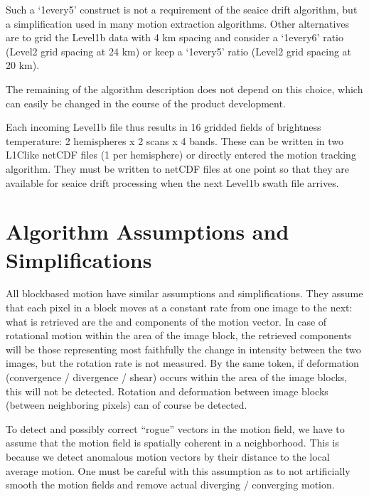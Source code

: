 \documentclass[letterpaper,10pt,english]{jupyterBook}
\begin{document}
\sphinxAtStartPar
Such a ‘1\sphinxhyphen{}every\sphinxhyphen{}5’ construct is not a requirement of the sea\sphinxhyphen{}ice drift algorithm, but a simplification used in many motion extraction algorithms. Other alternatives are to grid the Level\sphinxhyphen{}1b data with
4 km spacing and consider a ‘1\sphinxhyphen{}every\sphinxhyphen{}6’ ratio (Level\sphinxhyphen{}2 grid spacing at 24 km) or keep a ‘1\sphinxhyphen{}every\sphinxhyphen{}5’ ratio (Level\sphinxhyphen{}2 grid spacing at 20 km).

\sphinxAtStartPar
The remaining of the algorithm description does not depend on this choice, which can easily be changed in the course of the product development.

\sphinxAtStartPar
Each incoming Level\sphinxhyphen{}1b file thus results in 16 gridded fields of brightness temperature: 2 hemispheres x 2 scans x 4 bands. These can be written in two L1C\sphinxhyphen{}like netCDF files (1 per hemisphere) or
directly entered the motion tracking algorithm. They must be written to netCDF files at one point so that they are available for sea\sphinxhyphen{}ice drift processing when the next Level\sphinxhyphen{}1b swath file arrives.


\section{Algorithm Assumptions and Simplifications}
\label{\detokenize{baseline_algorithm_definition:algorithm-assumptions-and-simplifications}}
\sphinxAtStartPar
All block\sphinxhyphen{}based motion have similar assumptions and simplifications. They assume that each pixel in a block moves at a constant rate from one image to the next: what is retrieved are the  and 
components of the motion vector. In case of rotational motion within the area of the image block, the retrieved components will be those representing most faithfully the change in intensity between
the two images, but the rotation rate is not measured. By the same token, if deformation (convergence / divergence / shear) occurs within the area of the image blocks, this will not be detected.
Rotation and deformation between image blocks (between neighboring pixels) can of course be detected.

\sphinxAtStartPar
To detect and possibly correct “rogue” vectors in the motion field, we have to assume that the motion field is spatially coherent in a neighborhood. This is because we detect anomalous motion vectors
by their distance to the local average motion. One must be careful with this assumption as to not artificially smooth the motion fields and remove actual diverging / converging motion.
\end{document}
